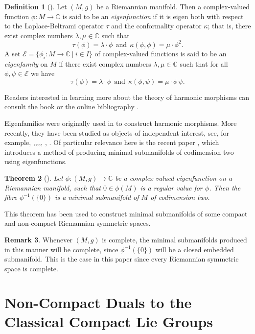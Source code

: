 \documentclass[11pt,reqno]{amsart}
\theoremstyle{plain}
\newtheorem{theorem}                 {Theorem}[section]
\theoremstyle{definition}
\newtheorem{definition}   [theorem]  {Definition}
\newtheorem{remark}       [theorem]  {Remark}
\numberwithin{equation}{section}
\def \cn{{\mathbb C}}
\def \E{\mathcal E}
\numberwithin{equation}{section}
\begin{document}
\begin{definition}[\cite{Gud-Sak-1}]\label{definition-eigenfamily}
Let $(M,g)$ be a Riemannian manifold. Then a complex-valued function $\phi:M\to\cn$ is said to be an {\it eigenfunction} if it is eigen both with respect to the Laplace-Beltrami operator $\tau$ and the conformality operator $\kappa$; that is, there exist complex numbers $\lambda,\mu\in\cn$ such that $$\tau(\phi)=\lambda\cdot\phi\ \ \text{and}\ \ \kappa(\phi,\phi)=\mu\cdot \phi^2.$$	
A set $\E =\{\phi_i:M\to\cn\ |\ i\in I\}$ of complex-valued functions is said to be an {\it eigenfamily} on $M$ if there exist complex numbers $\lambda,\mu\in\cn$ such that for all $\phi,\psi\in\E$ we have 
$$\tau(\phi)=\lambda\cdot\phi\ \ \text{and}\ \ \kappa(\phi,\psi)=\mu\cdot \phi\,\psi.$$ 
\end{definition}

Readers interested in learning more about the theory of harmonic morphisms can consult the book \cite{Bai-Woo-book} or the online bibliography \cite{Gud-bib}.

Eigenfamilies were originally used in \cite{Gud-Sak-1} to construct harmonic morphisms. More recently, they have been studied as objects of independent interest, see, for example, \cite{Gud-Sif-Sob-2},\cite{Gud-Sob-1},\cite{Rie-1},\cite{Rie-Sif-1},\cite{Mun-Rie-1}, \cite{Gha-Gud-4}, \cite{Gha-Gud-5}.
Of particular relevance here is the recent paper \cite{Gud-Mun-1}, which introduces a method of producing minimal submanifolds of codimension two using eigenfunctions.
\begin{theorem}[\cite{Gud-Mun-1}] \label{Gud-Mun-1-Thm}
Let $\phi:(M,g)\to\cn$ be a complex-valued eigenfunction on a Riemannian manifold, such that $0\in\phi(M)$ is a regular value for $\phi$.  Then the fibre $\phi^{-1}(\{0\})$ is a minimal submanifold of $M$ of codimension two.
\end{theorem}
This theorem has been used to construct minimal submanifolds of some compact
\cite{Geg-Gud-1} and non-compact \cite{Gud-Lar-1} Riemannian symmetric spaces.

\begin{remark}
	Whenever $(M,g)$ is complete, the minimal submanifolds produced in this manner will be complete, since $\phi^{-1}(\{0\})$ will be a closed embedded submanifold. This is the case in this paper since every Riemannian symmetric space is complete.
\end{remark}


\section{Non-Compact Duals to the Classical Compact Lie Groups}
\label{section-symmetric-spaces}
\end{document}
